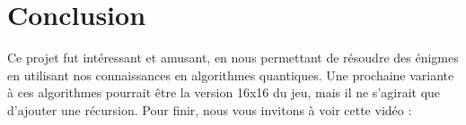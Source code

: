 \documentclass[12pt]{article}
\begin{document}
    \section{Conclusion}

    Ce projet fut intéressant et amusant, en nous permettant de résoudre des énigmes en utilisant nos connaissances en algorithmes quantiques.
    \newline
    Une prochaine variante à ces algorithmes pourrait être la version 16x16 du jeu, mais il ne s'agirait que d'ajouter une récursion.
    \newline
    \newline
    Pour finir, nous vous invitons à voir cette vidéo : \href{}{} %
    
\end{document}
